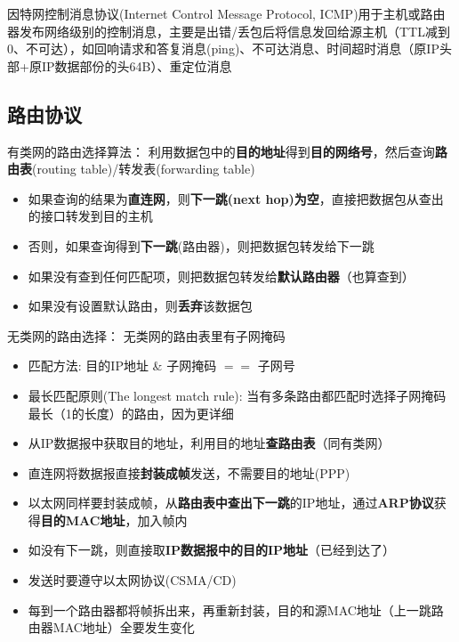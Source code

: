 因特网控制消息协议(Internet Control Message Protocol, ICMP)用于主机或路由器发布网络级别的控制消息，主要是出错/丢包后将信息发回给源主机（TTL减到0、不可达），如回响请求和答复消息(ping)、不可达消息、时间超时消息（原IP头部+原IP数据部份的头64B）、重定位消息


\subsection{路由协议}
有类网的路由选择算法：
利用数据包中的\textbf{目的地址}得到\textbf{目的网络号}，然后查询\textbf{路由表}(routing table)/转发表(forwarding table)
\begin{itemize}
	\item 如果查询的结果为\textbf{直连网}，则\textbf{下一跳(next hop)为空}，直接把数据包从查出的接口转发到目的主机
	\item 否则，如果查询得到\textbf{下一跳}(路由器)，则把数据包转发给下一跳
	\item 如果没有查到任何匹配项，则把数据包转发给\textbf{默认路由器}（也算查到）
	\item 如果没有设置默认路由，则\textbf{丢弃}该数据包
\end{itemize}

无类网的路由选择：
无类网的路由表里有子网掩码
\begin{itemize}
	\item 匹配方法: 目的IP地址 \& 子网掩码 $==$ 子网号
	\item 最长匹配原则(The longest match rule): 当有多条路由都匹配时选择子网掩码最长（1的长度）的路由，因为更详细
	\item 从IP数据报中获取目的地址，利用目的地址\textbf{查路由表}（同有类网）
	\item 直连网将数据报直接\textbf{封装成帧}发送，不需要目的地址(PPP)
	\item 以太网同样要封装成帧，从\textbf{路由表中查出下一跳}的IP地址，通过\textbf{ARP协议}获得\textbf{目的MAC地址}，加入帧内
	\item 如没有下一跳，则直接取\textbf{IP数据报中的目的IP地址}（已经到达了）
	\item 发送时要遵守以太网协议(CSMA/CD)
	\item 每到一个路由器都将帧拆出来，再重新封装，目的和源MAC地址（上一跳路由器MAC地址）全要发生变化
\end{itemize}

